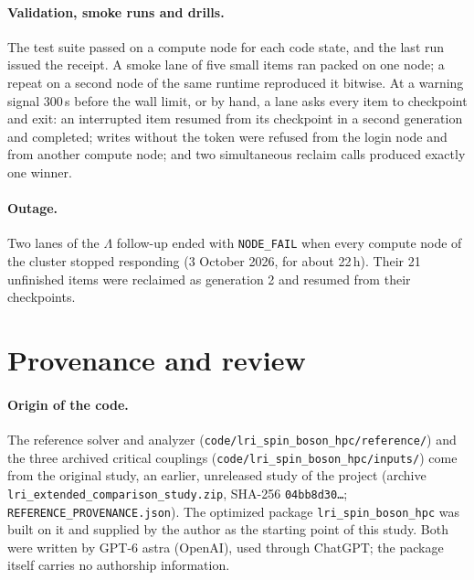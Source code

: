 \documentclass[10pt,a4paper]{article}
\newcommand{\code}[1]{\texttt{#1}}
\begin{document}
\paragraph{Validation, smoke runs and drills.} The test suite passed on a compute node for each code state, and the last run issued
the receipt. A smoke lane of five small items ran packed on one node; a repeat on a second node of the same runtime reproduced it
bitwise. At a warning signal 300\,s before the wall limit, or by hand, a lane asks every item to checkpoint and exit: an interrupted
item resumed from its checkpoint in a second generation and completed; writes without the token were refused from the login node and
from another compute node; and two simultaneous reclaim calls produced exactly one winner.

\paragraph{Outage.} Two lanes of the $\Lambda$ follow-up ended with \code{NODE\_FAIL} when every compute node of the cluster stopped
responding (3 October 2026, for about 22\,h). Their 21 unfinished items were reclaimed as generation 2 and resumed from their
checkpoints.

\begin{table}[ht]\centering\scriptsize
\caption{Every job of the study (node names anonymized). Thread-h is the sum over items of wall time times threads, from the lane
logs; each job held a whole node for its elapsed time.}\label{tab:resources}

\end{table}

\section{Provenance and review}\label{app:provenance}
\paragraph{Origin of the code.} The reference solver and analyzer (\code{code/lri\_spin\_boson\_hpc/reference/}) and the three
archived critical couplings (\code{code/lri\_spin\_boson\_hpc/inputs/}) come from the original study, an earlier, unreleased study of
the project (archive \code{lri\_extended\_comparison\_study.zip}, SHA-256 \code{04bb8d30\ldots}; \code{REFERENCE\_PROVENANCE.json}). The
optimized package \code{lri\_spin\_boson\_hpc} was built on it and supplied by the author as the starting point of this study. Both
were written by GPT-6 astra (OpenAI), used through ChatGPT; the package itself carries no authorship information.
\end{document}
